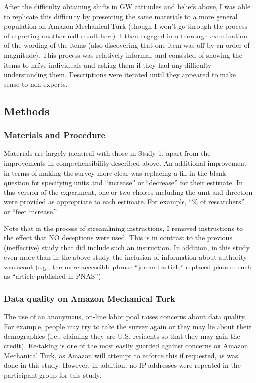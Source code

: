 After the difficulty obtaining shifts in GW attitudes and beliefs above, I was
able to replicate this difficulty by presenting the same materials to a more
general population on Amazon Mechanical Turk (though I won't go through the
process of reporting another null result here). I then engaged in a thorough
examination of the wording of the items (also discovering that one item was off
by an order of magnitude). This process was relatively informal, and consisted
of showing the items to naïve individuals and asking them if they had any
difficulty understanding them. Descriptions were iterated until they appeared to
make sense to non-experts.

\subsection{Methods}

\subsubsection{Materials and Procedure}

Materials are largely identical with those in Study 1, apart from the
improvements in comprehensibility described above. An additional improvement in
terms of making the survey more clear was replacing a fill-in-the-blank question
for specifying units and “increase” or “decrease” for their estimate. In this
version of the experiment, one or two choices including the unit and direction
were provided as appropriate to each estimate. For example, “\% of researchers”
or “feet increase.”

Note that in the process of streamlining instructions, I removed instructions to
the effect that NO deceptions were used. This is in contrast to the previous
(ineffective) study that did include such an instruction.  In addition, in this
study even more than in the above study, the inclusion of information about
authority was scant (e.g., the more accessible phrase “journal article” replaced
phrases such as “article published in PNAS”).

\subsubsection{Data quality on Amazon Mechanical Turk}
\label{sec:mturk-problems}

The use of an anonymous, on-line labor pool raises concerns about data quality.
For example, people may try to take the survey again or they may lie about their
demographics (i.e., claiming they are U.S. residents so that they may gain the
credit). Re-taking is one of the most easily guarded against concerns on Amazon
Mechanical Turk, as Amazon will attempt to enforce this if requested, as was
done in this study. However, in addition, no IP addresses were repeated in the
participant group for this study.

